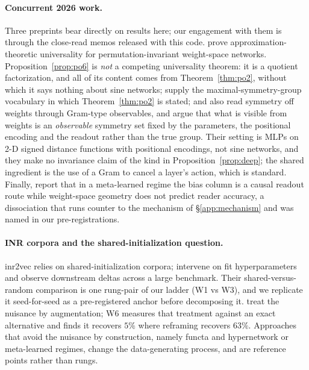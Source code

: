 \paragraph{Concurrent 2026 work.} Three preprints bear directly on results here; our engagement
with them is through the close-read memos released with this code.
\citet{wsn2026expressivity} prove approximation-theoretic universality for permutation-invariant
weight-space networks. Proposition~\ref{prop:po6} is
\emph{not} a competing universality theorem: it is a quotient factorization, and all of its
content comes from Theorem~\ref{thm:po2}, without which it says nothing about sine networks;
\citet{quasiequiv2026} supply the maximal-symmetry-group vocabulary in which
Theorem~\ref{thm:po2} is stated; and \citet{chiba2026observable} also read symmetry off weights through Gram-type observables, and
argue that what is visible from weights is an \emph{observable} symmetry set fixed by the
parameters, the positional encoding and the readout rather than the true group. Their setting is
MLPs on 2-D signed distance functions with positional encodings, not sine networks, and they make
no invariance claim of the kind in Proposition~\ref{prop:deep}; the shared ingredient is the use of
a Gram to cancel a layer's action, which is standard. Finally, \citet{clustered2026} report that in
a meta-learned regime the
bias column is a causal readout route while weight-space geometry does not predict reader accuracy, a dissociation that runs counter to the mechanism of \S\ref{app:mechanism} and was named in
our pre-registrations.

\paragraph{INR corpora and the shared-initialization question.} inr2vec \citep{deluigi2023inr2vec}
relies on shared-initialization corpora; \citet{papa2024howtotrain} intervene on fit
hyperparameters and observe downstream deltas across a large benchmark. Their shared-versus-random
comparison is one rung-pair of our ladder (W1 vs W3), and we replicate it seed-for-seed as a
pre-registered anchor before decomposing it. \citet{shamsian2024augmentations} treat the nuisance
by augmentation; W6 measures that treatment against an exact alternative and finds it recovers
$5\%$ where reframing recovers $63\%$. Approaches that avoid the nuisance by construction, namely functa \citep{dupont2022functa} and hypernetwork or meta-learned regimes, change the data-generating process, and are reference points rather than rungs.

